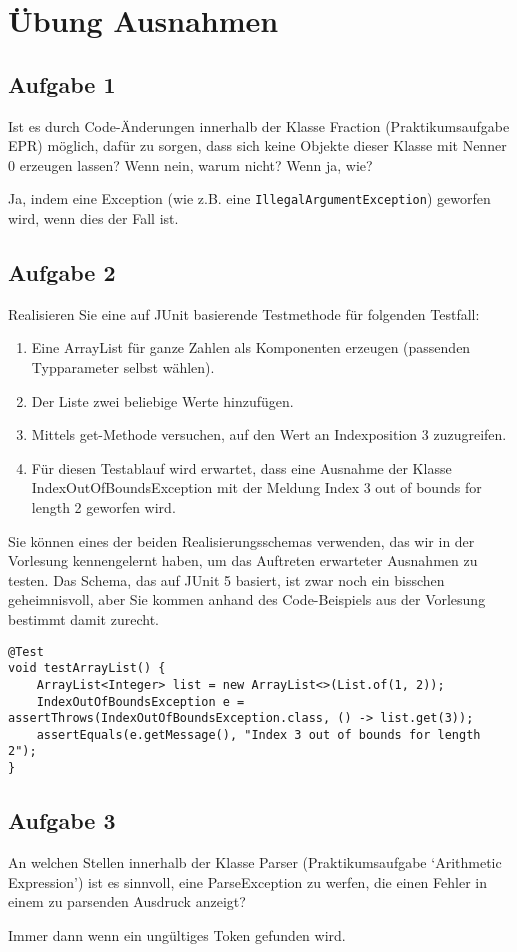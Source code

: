 \chapter{Übung Ausnahmen}

\section{Aufgabe 1}
Ist es durch Code-Änderungen innerhalb der Klasse Fraction (Praktikumsaufgabe
EPR) möglich, dafür zu sorgen, dass sich keine Objekte dieser Klasse mit Nenner
0 erzeugen lassen? Wenn nein, warum nicht? Wenn ja, wie?

Ja, indem eine Exception (wie z.B. eine \newline
\lstinline{IllegalArgumentException}) geworfen wird, wenn dies der Fall ist.

\section{Aufgabe 2}
Realisieren Sie eine auf JUnit basierende Testmethode für folgenden Testfall:
\begin{enumerate}
    \item Eine ArrayList für ganze Zahlen als Komponenten erzeugen (passenden
          Typparameter selbst wählen). \newline
    \item Der Liste zwei beliebige Werte hinzufügen.
    \item Mittels get-Methode versuchen, auf den Wert an Indexposition 3 zuzugreifen.
    \item Für diesen Testablauf wird erwartet, dass eine Ausnahme der Klasse
          IndexOutOfBoundsException mit der Meldung Index 3 out of bounds for length 2
          geworfen wird.
\end{enumerate}

Sie können eines der beiden Realisierungsschemas verwenden, das wir in der
Vorlesung kennengelernt haben, um das Auftreten erwarteter Ausnahmen zu
testen. Das Schema, das auf JUnit 5 basiert, ist zwar noch ein bisschen
geheimnisvoll, aber Sie kommen anhand des Code-Beispiels aus der Vorlesung
bestimmt damit zurecht.

\begin{lstlisting}
@Test
void testArrayList() {
    ArrayList<Integer> list = new ArrayList<>(List.of(1, 2));
    IndexOutOfBoundsException e = assertThrows(IndexOutOfBoundsException.class, () -> list.get(3));
    assertEquals(e.getMessage(), "Index 3 out of bounds for length 2");
}
\end{lstlisting}

\section{Aufgabe 3}
An welchen Stellen innerhalb der Klasse Parser (Praktikumsaufgabe `Arithmetic
Expression') ist es sinnvoll, eine ParseException zu werfen, die einen Fehler
in einem zu parsenden Ausdruck anzeigt?

Immer dann wenn ein ungültiges Token gefunden wird.